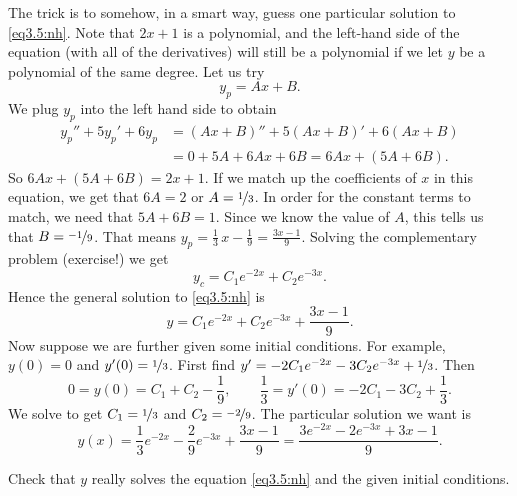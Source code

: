 \documentclass{ximera}
\begin{document}
The trick is to somehow, in a smart way, guess one particular solution to \eqref{eq3.5:nh}.  Note that $2x+1$ is a polynomial, and the left-hand side of the equation (with all of the derivatives) will still be a polynomial if we let $y$ be a polynomial of the same degree.  Let us try
\begin{equation*}
    y_p = Ax + B .
\end{equation*}
We plug $y_p$ into the left hand side to obtain
\begin{equation*}
    \begin{split}
        y_p'' + 5y_p'+ 6y_p & = (Ax+B)'' + 5(Ax+B)' + 6(Ax+B) \\
        & =  0 + 5A + 6Ax + 6B = 6Ax+ (5A+6B) .
    \end{split}
\end{equation*}
So $6Ax+(5A+6B) = 2x+1$. If we match up the coefficients of $x$ in this equation, we get that $6A = 2$ or $A = \nicefrac{1}{3}$. In order for the constant terms to match, we need that $5A + 6B = 1$. Since we know the value of $A$, this tells us that $B = \nicefrac{-1}{9}$. That means $y_p = \frac{1}{3}\, x - \frac{1}{9} = \frac{3x-1}{9}$. Solving the complementary problem (exercise!) we get
\begin{equation*}
    y_c = C_1 e^{-2x} + C_2 e^{-3x}.
\end{equation*}
Hence the general solution to \eqref{eq3.5:nh} is
\begin{equation*}
    y = C_1 e^{-2x} + C_2 e^{-3x} + \frac{3x-1}{9} .
\end{equation*}
Now suppose we are further given some initial conditions.  For example, $y(0) = 0$ and $y'(0) = \nicefrac{1}{3}$.  First find $y' = - 2C_1 e^{-2x} - 3C_2 e^{-3x}
+ \nicefrac{1}{3}$. Then
\begin{equation*}
    0 = y(0) = C_1 + C_2 -\frac{1}{9} , \qquad \frac{1}{3} = y'(0) = - 2C_1 - 3C_2 + \frac{1}{3} .
\end{equation*}
We solve to get $C_1 = \nicefrac{1}{3}$ and $C_2 = \nicefrac{-2}{9}$. The particular solution we want is
\begin{equation*}
    y(x) = \frac{1}{3} e^{-2x} - \frac{2}{9} e^{-3x} + \frac{3x-1}{9} = \frac{3 e^{-2x} - 2 e^{-3x} + 3x-1}{9} .
\end{equation*}

\begin{exercise}
Check that $y$ really solves the equation \eqref{eq3.5:nh} and the given initial conditions.
\end{exercise}
\end{document}
